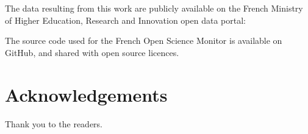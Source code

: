 \documentclass[
]{article}
\begin{document}
The data resulting from this work are publicly available on the French
Ministry of Higher Education, Research and Innovation open data portal:

The source code used for the French Open Science Monitor is available on
GitHub, and shared with open source licences.

\hypertarget{acknowledgements}{%
\section{Acknowledgements}\label{acknowledgements}}

Thank you to the readers.
\end{document}
